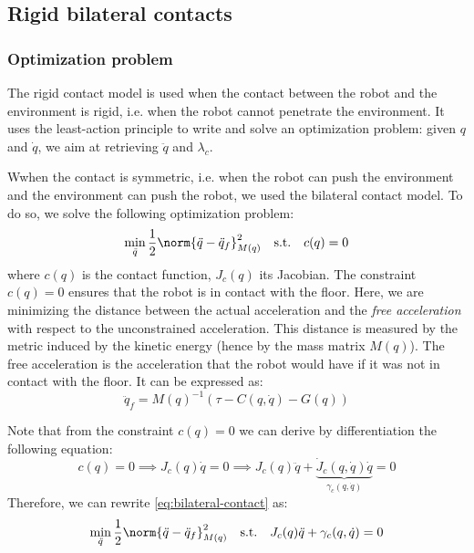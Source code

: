 \subsection{Rigid bilateral contacts}
\subsubsection{Optimization problem}
The rigid contact model is used when the contact between the robot and the environment is rigid, i.e. when the robot cannot penetrate the environment. It uses the least-action principle to write and solve an optimization problem: given $q$ and $\dot{q}$, we aim at retrieving $\ddot{q}$ and $\lambda_c$.

Wwhen the contact is symmetric, i.e. when the robot can push the environment and the environment can push the robot, we used the bilateral contact model. To do so, we solve the following optimization problem:
\begin{equation}
    \label{eq:bilateral-contact}
    \min_{\ddot{q}} \frac{1}{2}\norm{\ddot{q}-\ddot{q}_f}^2_{M(q)} \quad\text{s.t.}\quad c(q)=0
\end{equation}
where $c(q)$ is the contact function, $J_c(q)$ its Jacobian. The constraint $c(q)=0$ ensures that the robot is in contact with the floor. Here, we are minimizing the distance between the actual acceleration and the \emph{free acceleration} with respect to the unconstrained acceleration. This distance is measured by the metric induced by the kinetic energy (hence by the mass matrix $M(q)$). The free acceleration is the acceleration that the robot would have if it was not in contact with the floor. It can be expressed as:
\begin{equation*}
    \ddot{q}_f = M(q)^{-1}(\tau - C(q, \dot{q}) - G(q))
\end{equation*}

Note that from the constraint $c(q)=0$ we can derive by differentiation the following equation:
\begin{equation*}
    c(q)=0\implies J_c(q)\dot{q}=0 \implies J_c(q)\ddot{q} + \underbrace{\dot{J}_c(q,\dot{q})\dot{q}}_{\gamma_c(q, \dot{q})} = 0
\end{equation*}
Therefore, we can rewrite \autoref{eq:bilateral-contact} as:
\begin{equation}
    \min_{\ddot{q}} \frac{1}{2}\norm{\ddot{q}-\ddot{q}_f}^2_{M(q)} \quad\text{s.t.}\quad J_c(q)\ddot{q} + \gamma_c(q, \dot{q}) = 0
\end{equation}


